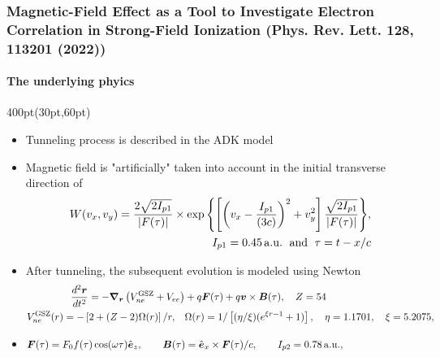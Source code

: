 \begin{frame}
\frametitle{Magnetic-Field Effect as a Tool to Investigate 
Electron Correlation in Strong-Field Ionization
\small (Phys. Rev. Lett. 128, 113201 (2022))}
\framesubtitle{The underlying phyics}


\small
\begin{textblock*}{400pt}(30pt,60pt)
\begin{itemize}
\footnotesize
\item Tunneling process is described in the ADK model
\vspace{10pt}
\item Magnetic field is "artificially" taken into account 
in the initial transverse direction of
\begin{align}
  W(v_x,v_y) = 
\frac{2\sqrt{2I_{p1}}}{|F(\tau)|}
\times \exp{\left\lbrace\left[
\left(v_x-\frac{I_{p1}}{(3c)}\right)^2 + v_y^2\right]
 \frac{\sqrt{2I_{p1}}}{|F(\tau)|}\right\rbrace}, & \nonumber\\
\vspace{10pt}
I_{p1} = 0.45\,{\rm a.u.}\;\mbox{ and }\; \tau = t - x/c & \nonumber
\end{align}
\item After tunneling, the subsequent evolution is modeled 
using Newton
\begin{align}
  \frac{d^2\boldsymbol{r}}{dt^2} = 
  -\boldsymbol{\nabla}_{\boldsymbol{r}}
\left(  V_{ne}^{\rm GSZ} + V_{ee}  \right)
& + q\boldsymbol{F}(\tau)
+ q\boldsymbol{v}\times\boldsymbol{B}(\tau), \hspace{10pt} Z=54\nonumber \\
V_{ne}^{\rm GSZ}(r) = -\left[2 + (Z - 2)\Omega (r)\right]/r,
\hspace{10pt}
& \Omega (r) =1/\left[ (\eta/\xi) (e^{\xi r -1}+1)\right], \hspace{10pt} 
\eta = 1.1701, \hspace{10pt} \xi = 5.2075,
\nonumber
\end{align}
\item 
\begin{align}
\boldsymbol{F}(\tau) = F_0 f(\tau)\cos(\omega\tau)\hat{\boldsymbol{e}}_z,
\hspace{20pt}
\boldsymbol{B}(\tau) = \hat{\boldsymbol{e}}_x \times \boldsymbol{F}(\tau)/c &, 
 \hspace{20pt} I_{p2} = 0.78\,\rm a.u., \hspace{80pt} \nonumber
\end{align}
\end{itemize}
\end{textblock*}



\end{frame}


